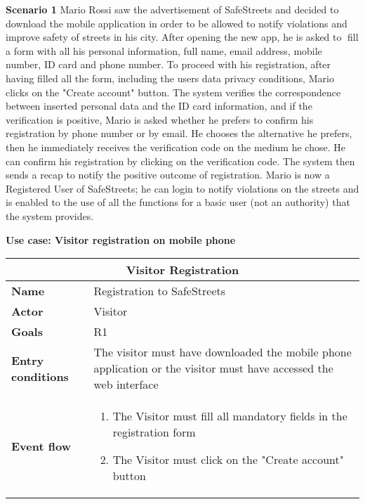 \begin{description}
    \item \label{scenario1} \textbf{Scenario 1} \newline
        Mario Rossi saw the advertisement of SafeStreets and decided to download the mobile application in order to be allowed to notify violations and improve safety of streets in his city. After
        opening the new app, he is asked to fill a form with all his personal information, full name, email address, mobile number, ID card and phone number. To proceed with his
        registration, after having filled all the form, including the users data privacy conditions, Mario clicks on the "Create account" button. The system verifies the correspondence between inserted personal data and the ID card information,
        and if the verification is positive, Mario is asked whether he prefers to confirm his registration by phone number or by email.
        He chooses the alternative he prefers, then he immediately receives the verification code on the medium he chose.
        He can confirm his registration by clicking on the verification code. The system then sends a recap to notify the positive outcome of registration. Mario is now a Registered
        User of SafeStreets; he can login to notify violations on the streets and is enabled to the use of all the functions for a basic user (not an authority) that the system provides.
    \item \textbf{Use case: Visitor registration on mobile phone}
    \begin{center}
        \begin{tabular}{|p{3cm}|p{7cm}|}
            \multicolumn{2}{c}{\textbf{Visitor Registration}} \\
            \hline
            \textbf{Name} & Registration to SafeStreets \\
            \hline
            \textbf{Actor} & Visitor \\
            \hline
            \textbf{Goals} & R1 \\
            \hline
            \textbf{Entry conditions} & The visitor must have downloaded the mobile phone application or the visitor must have accessed the web interface \\
            \hline
            \textbf{Event flow} &
            \begin{enumerate}
                \item The Visitor must fill all mandatory fields in the registration form
                \item The Visitor must click on the "Create account" button

\end{enumerate}
\end{tabular}
\end{center}
\end{description}
